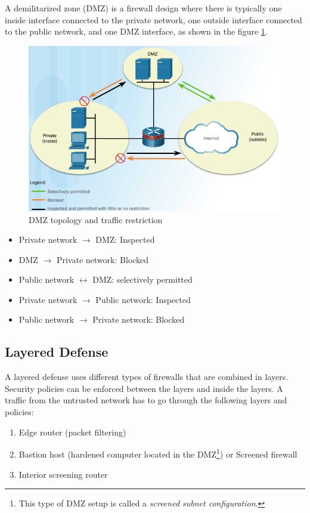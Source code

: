 A demilitarized zone (DMZ) is a firewall design where there is typically one inside interface connected to the private network, one outside interface connected to the public network, and one DMZ interface, as shown in the figure \ref{DMZfilter}.

\begin{figure}[hbtp]
\caption{DMZ topology and traffic restriction}\label{DMZfilter}
\centering
\includegraphics[width=10\xm]{pictures/DMZfilter.PNG}
\end{figure}

\begin{itemize}
\item Private network $\rightarrow$ DMZ: Inspected 
\item DMZ  $\rightarrow$ Private network: Blocked
\item Public network  $\leftrightarrow$ DMZ: selectively permitted
\item Private network $\rightarrow$ Public network: Inspected
\item Public network $\rightarrow$ Private network: Blocked
\end{itemize}

\subsection{Layered Defense}

A layered defense uses different types of firewalls that are combined in layers. Security policies can be enforced between the layers and inside the layers. A traffic from the untrusted network has to go through the following layers and policies:

\begin{enumerate}
\item Edge router (packet filtering)
\item Bastion host (hardened computer located in the DMZ\footnote{This type of DMZ setup is called a \emph{screened subnet configuration}.}) or Screened firewall
\item Interior screening router
\end{enumerate}

